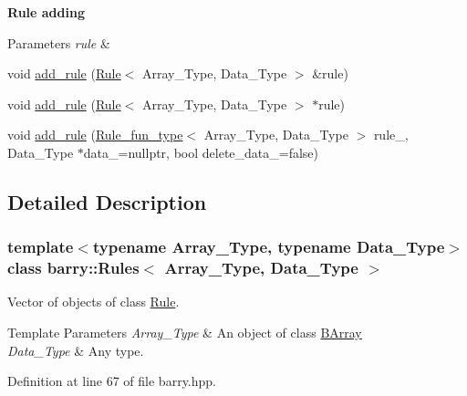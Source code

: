 \begin{Indent}\textbf{ Rule adding}\par
{\em 
\begin{DoxyParams}{Parameters}
{\em rule} & \\
\hline
\end{DoxyParams}
}\begin{DoxyCompactItemize}
\item 
void \hyperlink{classbarry_1_1_rules_a60583152fddcb11178dcf3d02a924d7c}{add\+\_\+rule} (\hyperlink{classbarry_1_1_rule}{Rule}$<$ Array\+\_\+\+Type, Data\+\_\+\+Type $>$ \&rule)
\item 
void \hyperlink{classbarry_1_1_rules_abd60b1d381ad0c8a772e4d81264bbe0a}{add\+\_\+rule} (\hyperlink{classbarry_1_1_rule}{Rule}$<$ Array\+\_\+\+Type, Data\+\_\+\+Type $>$ $\ast$rule)
\item 
void \hyperlink{classbarry_1_1_rules_abbc63747014445b538384bb500464bb5}{add\+\_\+rule} (\hyperlink{namespacebarry_aefd7e6d4ba228e2ce1074d075c512178}{Rule\+\_\+fun\+\_\+type}$<$ Array\+\_\+\+Type, Data\+\_\+\+Type $>$ rule\+\_\+, Data\+\_\+\+Type $\ast$data\+\_\+=nullptr, bool delete\+\_\+data\+\_\+=false)
\end{DoxyCompactItemize}
\end{Indent}


\subsection{Detailed Description}
\subsubsection*{template$<$typename Array\+\_\+\+Type, typename Data\+\_\+\+Type$>$\newline
class barry\+::\+Rules$<$ Array\+\_\+\+Type, Data\+\_\+\+Type $>$}

Vector of objects of class \hyperlink{classbarry_1_1_rule}{Rule}. 


\begin{DoxyTemplParams}{Template Parameters}
{\em Array\+\_\+\+Type} & An object of class {\ttfamily \hyperlink{classbarry_1_1_b_array}{B\+Array}} \\
\hline
{\em Data\+\_\+\+Type} & Any type. \\
\hline
\end{DoxyTemplParams}


Definition at line 67 of file barry.\+hpp.



